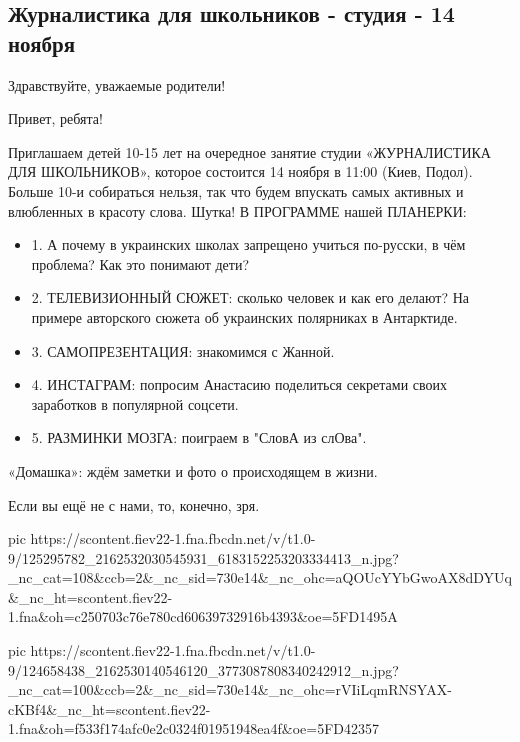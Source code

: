  
 
 

\subsection{Журналистика для школьников - студия - 14 ноября}

Здравствуйте, уважаемые родители!

Привет, ребята!

Приглашаем детей 10-15 лет на очередное занятие студии «ЖУРНАЛИСТИКА ДЛЯ
ШКОЛЬНИКОВ», которое состоится 14 ноября в 11:00 (Киев, Подол). Больше 10-и
собираться нельзя, так что будем впускать самых активных и влюбленных в красоту
слова.  Шутка!  В ПРОГРАММЕ нашей ПЛАНЕРКИ:

\begin{itemize}
  \item 1. А почему в украинских школах запрещено учиться по-русски, в чём проблема? Как это понимают дети?
  \item 2. ТЕЛЕВИЗИОННЫЙ СЮЖЕТ: сколько человек и как его делают? На примере авторского сюжета об украинских полярниках в Антарктиде.
  \item 3. САМОПРЕЗЕНТАЦИЯ: знакомимся с Жанной.
  \item 4. ИНСТАГРАМ: попросим Анастасию поделиться секретами своих заработков в популярной соцсети.
  \item 5. РАЗМИНКИ МОЗГА: поиграем в "СловА из слОва".
\end{itemize}

«Домашка»: ждём заметки и фото о происходящем в жизни.  

Если вы ещё не с нами, то, конечно, зря.

\ifcmt
pic https://scontent.fiev22-1.fna.fbcdn.net/v/t1.0-9/125295782_2162532030545931_6183152253203334413_n.jpg?_nc_cat=108&ccb=2&_nc_sid=730e14&_nc_ohc=aQOUcYYbGwoAX8dDYUq&_nc_ht=scontent.fiev22-1.fna&oh=c250703c76e780cd60639732916b4393&oe=5FD1495A

pic https://scontent.fiev22-1.fna.fbcdn.net/v/t1.0-9/124658438_2162530140546120_3773087808340242912_n.jpg?_nc_cat=100&ccb=2&_nc_sid=730e14&_nc_ohc=rVIiLqmRNSYAX-cKBf4&_nc_ht=scontent.fiev22-1.fna&oh=f533f174afc0e2c0324f01951948ea4f&oe=5FD42357

